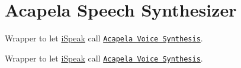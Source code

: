 \section{Acapela Speech Synthesizer}
\label{group__acapela-tts}


Wrapper to let \hyperlink{group__iSpeak}{i\+Speak} call \href{http://www.acapela-group.com}{\tt Acapela Voice Synthesis}.  


Wrapper to let \hyperlink{group__iSpeak}{i\+Speak} call \href{http://www.acapela-group.com}{\tt Acapela Voice Synthesis}. 

